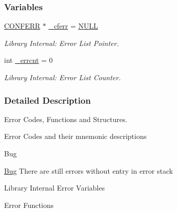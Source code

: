 \subsubsection*{Variables}
\begin{DoxyCompactItemize}
\item 
\hypertarget{group__errors_gaf90ef6c88b6c820ee65553b7621ac1d3}{\hyperlink{struct_c_o_n_f_e_r_r}{C\-O\-N\-F\-E\-R\-R} $\ast$ \hyperlink{group__errors_gaf90ef6c88b6c820ee65553b7621ac1d3}{\-\_\-cferr} = \hyperlink{group__cflib__core_ga070d2ce7b6bb7e5c05602aa8c308d0c4}{N\-U\-L\-L}}\label{group__errors_gaf90ef6c88b6c820ee65553b7621ac1d3}

\begin{DoxyCompactList}\small\item\em Library Internal\-: Error List Pointer. \end{DoxyCompactList}\item 
\hypertarget{group__errors_gabb3fc965f2aa8ec8a52f79975d9f918e}{int \hyperlink{group__errors_gabb3fc965f2aa8ec8a52f79975d9f918e}{\-\_\-errcnt} = 0}\label{group__errors_gabb3fc965f2aa8ec8a52f79975d9f918e}

\begin{DoxyCompactList}\small\item\em Library Internal\-: Error List Counter. \end{DoxyCompactList}\end{DoxyCompactItemize}


\subsubsection{Detailed Description}
Error Codes, Functions and Structures. 
\begin{DoxyItemize}
\item Error Codes and their mnemonic descriptions
\end{DoxyItemize}

\begin{DoxyRefDesc}{Bug}
\item[\hyperlink{bug__bug000001}{Bug}]There are still errors without entry in error stack\end{DoxyRefDesc}



\begin{DoxyItemize}
\item Library Internal Error Variables
\begin{DoxyItemize}
\item Error Functions 
\end{DoxyItemize}
\end{DoxyItemize}

